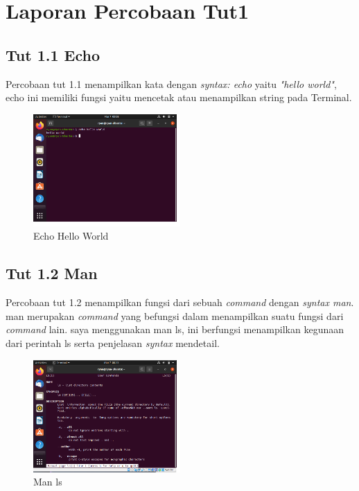 \documentclass[11pt,a4paper]{article}
\begin{document}
\section{Laporan Percobaan Tut1}
\subsection{Tut 1.1 Echo}
    Percobaan tut 1.1 menampilkan kata dengan \textit{syntax: echo} yaitu \textit{"hello world"}, echo ini memiliki fungsi yaitu mencetak atau menampilkan string pada Terminal.
    \begin{figure}[h]
    \centering
    \includegraphics[width=0.5\textwidth]{Gambar/tut 1.1 echo.png}
    \caption{Echo Hello World}
    \label{fig:my_label}
    \end{figure}
    \newpage
    
\subsection{Tut 1.2 Man}
     Percobaan tut 1.2 menampilkan fungsi dari sebuah \textit{command} dengan \textit{syntax man}. man merupakan \textit{command} yang befungsi dalam menampilkan suatu fungsi dari \textit{command} lain. saya menggunakan man ls, ini berfungsi menampilkan kegunaan dari perintah ls serta penjelasan \textit{syntax} mendetail.
     \begin{figure}[h]
     \centering
    \includegraphics[width=0.5\textwidth]{Gambar/tut 1.2 man-ls.png}
    \caption{Man ls}
    \label{fig:my_label}
    \end{figure}
\end{document}
